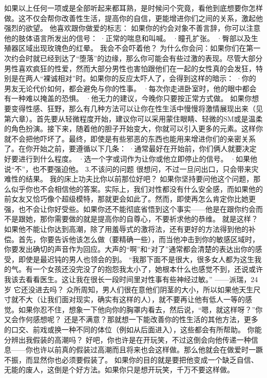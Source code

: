 \documentclass[12pt,UTF8,openany]{ctexbook}
\begin{document}
如果以上任何一项或是全部听起来都耳熟，是时候问个究竟，看他到底想要你怎样做。这不仅会帮你改善性生活，提高你的自信，更能增进你们之间的关系，激起他强烈的欲望。
他喜欢跟你做爱的标志：
如果你的约会对象不善言辞，你可以注意他的肢体语言所发出的信号：
·正常的喘息和叫喊。
·瞳孔扩张。
·臀部以及生殖器区域出现玫瑰色的红晕。
我会不会吓着他？
为什么你会问：如果你们在第一次约会时就已经到达了“堕落”的边缘，那么你可能会有些过激的表现。尽管大部分男性喜欢疯狂的性爱，然而大部分男性也害怕跟他们在一起的女性真的会发狂，特别是在两人“裸诚相对”时。如果你的反应太吓人了，会得到这样的暗示：
·你的男友无论代价如何，都会避免与你的性事。
·每次你走进卧室时，他的眼中都会有一种难以掩盖的恐惧。
·他无力的建议，今晚你只要按正常方式做。
如果你想要变得性感、狂野，那么有几种方法可以让你在性生活中慢慢将激情展现出来（见第六章）。首先要从轻微程度开始，建议你可以采用蒙住眼睛、轻微的SM或是温柔的角色扮演。接下来，随着他的胆子开始变大，你就可以引入更多的元素。这样你就不会把他吓坏了。最终，即使是有些邪恶的东西也能用来增进你们的亲密关系了。在你开始之前，要遵循以下几条：
·通常最好在开始前，你们俩人就要决定好要进行到什么程度。
·选一个字或词作为让你或他立即停止的信号。
·如果他说“不”，也不要强迫他。
3.不该问的问题
很想问，不过一旦问出口，只会带来灾难性的结果。
我的床上功夫比你以前那位好吧？
如果你坚持要问他这个问题，那么似乎你也不会相信他的答案。实际上，我们对性都没有什么安全感，而如果他的前女友又恰巧像个超级模特，那就更会如此了。然而，即使再怎么肯定你比她更强，也不会让你好受些。如果你还不能彻底省悟到这个事实——他是在跟你约会而不是跟她，那你需要做的就是提高你的自尊心，不要祈求他的恭维。
就是这样？
如果他不能让你达到高潮，除了用羞辱式的激将法，还有更好的方法得到他的补偿。首先，你要告诉他该怎么做（要精确一些），而当他冲击到你的敏感区域时，你要发出确切的声音作为回应。大声的“啊”和“对了”通常都会清楚的表达出你的感受，即使是最迟钝的男人也领会的到。
“我那下面不是很大，很多女人都为这生我的气。有一个女孩还没完没了的抱怨我太小了，她根本什么也感觉不到，还说或许我该去看看医生。这让我在很长一段时间里对性事有些神经过敏。”
——派瑞，24岁
它还没进去吗？
众所周知，男人们很在意他们阴茎的大小，所以如果他天生尺寸就不大（让我们面对现实，确实有这样的人），就不要再让他有低人一等的感觉。如果你忍不住，想象一下他向你的胸罩内看去，然后说，“嗯，就这样呀？”你又会作何感想呢？
还是不满意？那就想一下能改善你的性生活的其他方法，更多的口交、前戏或换一种不同的体位（例如从后面进入），这些都会有所帮助。
你能分辨出我假装的高潮吗？
好吧，你也许是在开玩笑，不过这倒会向他传递一种信息——你也许以前真的假装过高潮而且将来也会这样做。那么他就会在做爱时一蹶不振，而显然你也必须要假装了。
如果你的目的就是要把他变成一个缺乏自信、无能的废人，这倒是个好方法。如果你只是想开玩笑，千万不要这样做。
\end{document}
